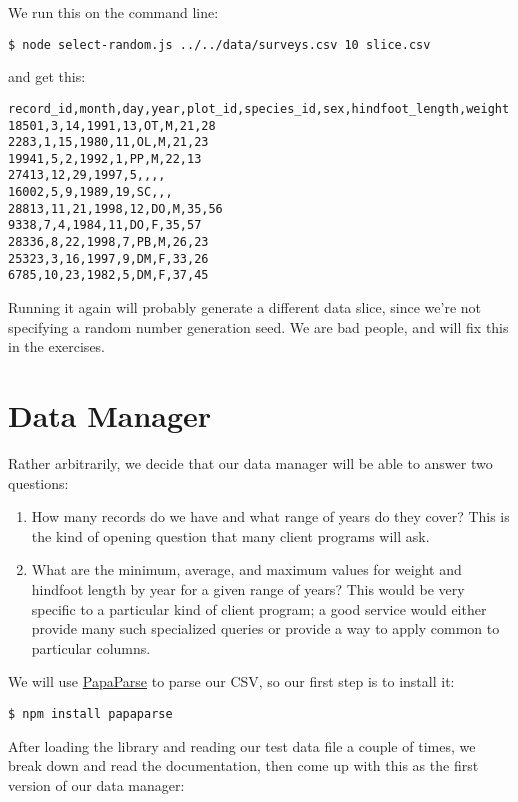 We run this on the command line:

\begin{verbatim}
$ node select-random.js ../../data/surveys.csv 10 slice.csv
\end{verbatim}

and get this:

\begin{verbatim}
record_id,month,day,year,plot_id,species_id,sex,hindfoot_length,weight
18501,3,14,1991,13,OT,M,21,28
2283,1,15,1980,11,OL,M,21,23
19941,5,2,1992,1,PP,M,22,13
27413,12,29,1997,5,,,,
16002,5,9,1989,19,SC,,,
28813,11,21,1998,12,DO,M,35,56
9338,7,4,1984,11,DO,F,35,57
28336,8,22,1998,7,PB,M,26,23
25323,3,16,1997,9,DM,F,33,26
6785,10,23,1982,5,DM,F,37,45
\end{verbatim}

Running it again will probably generate a different data slice,
since we're not specifying a random number generation seed.
We are bad people, and will fix this in the exercises.

\section{Data Manager}\label{s:dataman-manager}

Rather arbitrarily,
we decide that our data manager will be able to answer two questions:

\begin{enumerate}
\item
  How many records do we have and what range of years do they cover?
  This is the kind of opening question that many client programs will ask.
\item
  What are the minimum, average, and maximum values
  for weight and hindfoot length by year
  for a given range of years?
  This would be very specific to a particular kind of client program;
  a good service would either provide many such specialized queries
  or provide a way to apply common 
  to particular columns.
\end{enumerate}

We will use \href{https://www.papaparse.com/}{PapaParse} to parse our CSV,
so our first step is to install it:

\begin{verbatim}
$ npm install papaparse
\end{verbatim}

After loading the library and reading our test data file a couple of times,
we break down and read the documentation,
then come up with this as the first version of our data manager:

